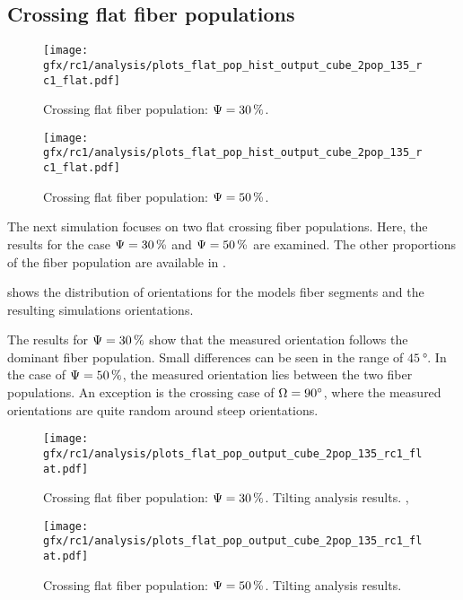 \subsection{Crossing flat fiber populations}
\label{sec:resCrossFlat}
%
\begin{figure}[!p]
\centering
\texttt{[image: gfx/rc1/analysis/plots\_flat\_pop\_hist\_output\_cube\_2pop\_135\_rc1\_flat.pdf]}
\caption{Crossing flat fiber population: $\textnormal{$\Psi$}=\SI{30}{\percent}$.}
\label{fig:flat_03_fiber_pop_hist}
% 
\vspace{2em}
\texttt{[image: gfx/rc1/analysis/plots\_flat\_pop\_hist\_output\_cube\_2pop\_135\_rc1\_flat.pdf]}
\caption{Crossing flat fiber population: $\textnormal{$\Psi$}=\SI{50}{\percent}$.}
\label{fig:flat_05_fiber_pop_hist}
\end{figure}
%
The next simulation focuses on two flat crossing fiber populations.
Here, the results for the case $\textnormal{$\Psi$} = \SI{30}{\percent}$ and $\textnormal{$\Psi$} = \SI{50}{\percent}$ are examined.
The other proportions of the fiber population are available in .
\par
%
 shows the distribution of orientations for the models fiber segments and the resulting simulations orientations.
\par
% 
The results for $\textnormal{$\Psi$} = \SI{30}{\percent}$ show that the measured orientation follows the dominant fiber population.
Small differences can be seen in the range of $\SI{45}{\degree}$.
In the case of $\textnormal{$\Psi$} = \SI{50}{\percent}$, the measured orientation lies between the two fiber populations.
An exception is the crossing case of $\textnormal{$\Omega$}=\SI{90}{\degree}$, where the measured orientations are quite random around steep orientations.
\par
%
\begin{figure}[!p]
\centering
\texttt{[image: gfx/rc1/analysis/plots\_flat\_pop\_output\_cube\_2pop\_135\_rc1\_flat.pdf]}
\caption{Crossing flat fiber population: $\textnormal{$\Psi$}=\SI{30}{\percent}$. Tilting analysis results. ,  }
\label{fig:flat_03_fiber_pop_rofl}
\end{figure}
%
\begin{figure}[!p]
\centering
\texttt{[image: gfx/rc1/analysis/plots\_flat\_pop\_output\_cube\_2pop\_135\_rc1\_flat.pdf]}
\caption{Crossing flat fiber population: $\textnormal{$\Psi$}=\SI{50}{\percent}$. Tilting analysis results.}
\label{fig:flat_05_fiber_pop_rofl}
\end{figure}
